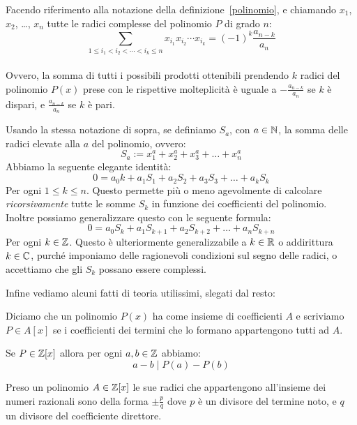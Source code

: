 \documentclass[11pt]{scrartcl}
\begin{document}
	\begin{theorem}[Viète] 
		Facendo riferimento alla notazione della definizione~\ref{polinomio}, e chiamando $x_1$, $x_2$, \dots, $x_n$ tutte le radici complesse del polinomio $P$ di grado $n$: 
		$$\sum_{1\le i_1 < i_2 < \cdots < i_k\le n} x_{i_1}x_{i_2}\cdots x_{i_k}=(-1)^k\frac{a_{n-k}}{a_n}$$
		\\ Ovvero, la somma di tutti i possibili prodotti ottenibili prendendo $k$ radici del polinomio $P(x)$ prese con le rispettive molteplicità è uguale a $-\frac{a_{n-k}}{a_n}$ se $k$ è dispari, e $\frac{a_{n-k}}{a_n}$ se $k$ è pari.
		
	\end{theorem}
	\begin{theorem} 
		Usando la stessa notazione di sopra, se definiamo $S_a$, con $a\in\mathbb N$, la somma delle radici elevate alla $a$ del polinomio, ovvero:
		$$S_a:=x_1^a+x_2^a+x_3^a+\dots+x_n^a$$
		Abbiamo la seguente elegante identità:
		$$0=a_0k+a_1S_1+a_2S_2+a_3S_3+\dots+a_kS_k$$
		Per ogni $1\le k \le n$.
		Questo permette più o meno agevolmente di calcolare \textit{ricorsivamente} tutte le somme $S_k$ in funzione dei coefficienti del polinomio.
		\\
		Inoltre possiamo generalizzare questo con le seguente formula:
		$$0=a_0S_k+a_1S_{k+1}+a_2S_{k+2}+\dots+a_nS_{k+n}$$
		Per ogni $k \in \mathbb Z$. Questo è ulteriormente generalizzabile a $k \in \mathbb R$ o addirittura $k \in \mathbb C$, purché imponiamo delle ragionevoli condizioni sul segno delle radici, o accettiamo che gli $S_k$ possano essere complessi.
	\end{theorem}
	Infine vediamo alcuni fatti di teoria utilissimi, slegati dal resto:
	\begin{definition}
		Diciamo che un polinomio $P(x)$ ha come insieme di coefficienti $A$ e scriviamo $P \in A[x]$ se i coefficienti dei termini che lo formano appartengono tutti ad $A$.
	\end{definition}
	\begin{theorem}
		Se $P \in \mathbb Z[x]$ allora per ogni $a,b\in\mathbb Z$ abbiamo:
		$$a-b \mid P(a)-P(b)$$
	\end{theorem}
	\begin{theorem}
		Preso un polinomio $A \in \mathbb Z[x]$ le sue radici che appartengono all'insieme dei numeri razionali sono della forma $\pm\frac{p}{q}$ dove $p$ è un divisore del termine noto, e $q$ un divisore del coefficiente direttore.
	\end{theorem}
	
\end{document}
